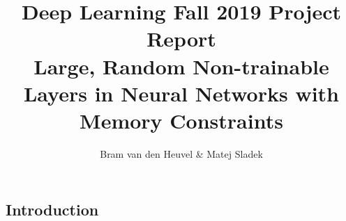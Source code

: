 \documentclass[]{article}
\title{Deep Learning Fall 2019 Project Report\\\large{Large, Random Non-trainable Layers in Neural Networks with Memory Constraints}}
\author{Bram van den Heuvel \& Matej Sladek}
\begin{document}
\maketitle

\begin{abstract}

\end{abstract}


\begin{multicols}{2}
	\section{Introduction}

\end{multicols}
\end{document}
